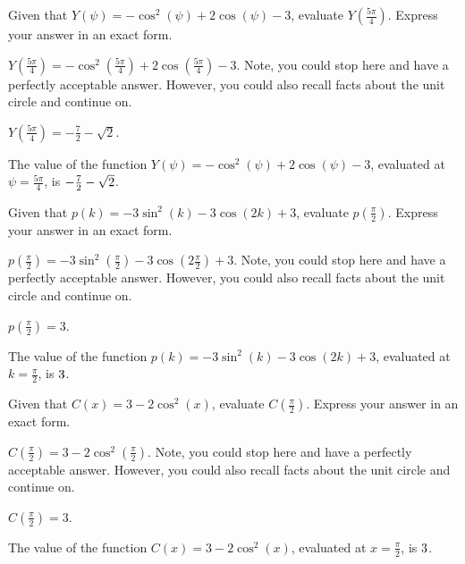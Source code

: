 \begin{shuffle}
\begin{exercise}
Given that $Y(\psi)=-\cos ^2(\psi )+2 \cos (\psi )-3$, evaluate $Y\left(\frac{5 \pi }{4}\right)$. Express your answer in an exact form.
\begin{solution}
\begin{hint}
$Y\left(\frac{5 \pi }{4}\right)=-\cos ^2\left(\frac{5 \pi }{4}\right)+2 \cos \left(\frac{5 \pi }{4}\right)-3$. Note, you could stop here and have a perfectly acceptable answer. However, you could also recall facts about the unit circle and continue on. 
\end{hint}
\begin{hint}
$Y\left(\frac{5 \pi }{4}\right)=-\frac{7}{2}-\sqrt{2}$.
\end{hint}
The value of the function $Y(\psi)=-\cos ^2(\psi )+2 \cos (\psi )-3$, evaluated at $\psi=\frac{5 \pi }{4}$, is ${-\frac{7}{2}-\sqrt{2}}$.
\end{solution}
\end{exercise}

\begin{exercise}
Given that $p(k)=-3 \sin ^2(k)-3 \cos (2 k)+3$, evaluate $p\left(\frac{\pi }{2}\right)$. Express your answer in an exact form.
\begin{solution}
\begin{hint}
$p\left(\frac{\pi }{2}\right)=-3 \sin ^2\left(\frac{\pi }{2}\right)-3 \cos \left(2 \frac{\pi }{2}\right)+3$. Note, you could stop here and have a perfectly acceptable answer. However, you could also recall facts about the unit circle and continue on. 
\end{hint}
\begin{hint}
$p\left(\frac{\pi }{2}\right)=3$.
\end{hint}
The value of the function $p(k)=-3 \sin ^2(k)-3 \cos (2 k)+3$, evaluated at $k=\frac{\pi }{2}$, is ${3}$.
\end{solution}
\end{exercise}

\begin{exercise}
Given that $C(x)=3-2 \cos ^2(x)$, evaluate $C\left(\frac{\pi }{2}\right)$. Express your answer in an exact form.
\begin{solution}
\begin{hint}
$C\left(\frac{\pi }{2}\right)=3-2 \cos ^2\left(\frac{\pi }{2}\right)$. Note, you could stop here and have a perfectly acceptable answer. However, you could also recall facts about the unit circle and continue on. 
\end{hint}
\begin{hint}
$C\left(\frac{\pi }{2}\right)=3$.
\end{hint}
The value of the function $C(x)=3-2 \cos ^2(x)$, evaluated at $x=\frac{\pi }{2}$, is ${3}$.
\end{solution}
\end{exercise}


\end{shuffle}

